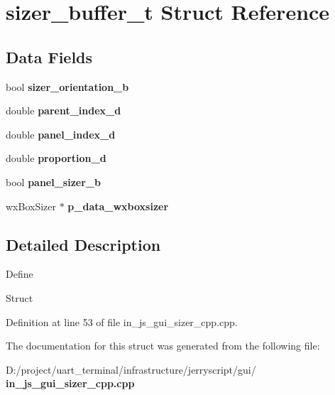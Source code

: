 \section{sizer\+\_\+buffer\+\_\+t Struct Reference}
\label{structsizer__buffer__t}
\subsection*{Data Fields}
\begin{DoxyCompactItemize}
\item 
\mbox{\label{structsizer__buffer__t_a7dac49d74e11d058f831963b78f5ecb9}} 
bool {\bfseries sizer\+\_\+orientation\+\_\+b}
\item 
\mbox{\label{structsizer__buffer__t_add751934d2a529afad976d242fc55e2a}} 
double {\bfseries parent\+\_\+index\+\_\+d}
\item 
\mbox{\label{structsizer__buffer__t_a45b7a2c22221685e5adddbf8103dbd0f}} 
double {\bfseries panel\+\_\+index\+\_\+d}
\item 
\mbox{\label{structsizer__buffer__t_a93e3ac3895fbb25863fb66af78e0ed39}} 
double {\bfseries proportion\+\_\+d}
\item 
\mbox{\label{structsizer__buffer__t_a90ec21f584d3ff4e0b46638dcbd75511}} 
bool {\bfseries panel\+\_\+sizer\+\_\+b}
\item 
\mbox{\label{structsizer__buffer__t_a5575261b498c096138b83ca6ca568520}} 
wx\+Box\+Sizer $\ast$ {\bfseries p\+\_\+data\+\_\+wxboxsizer}
\end{DoxyCompactItemize}


\subsection{Detailed Description}
Define

Struct 

Definition at line 53 of file in\+\_\+js\+\_\+gui\+\_\+sizer\+\_\+cpp.\+cpp.



The documentation for this struct was generated from the following file\+:\begin{DoxyCompactItemize}
\item 
D\+:/project/uart\+\_\+terminal/infrastructure/jerryscript/gui/\textbf{ in\+\_\+js\+\_\+gui\+\_\+sizer\+\_\+cpp.\+cpp}\end{DoxyCompactItemize}
